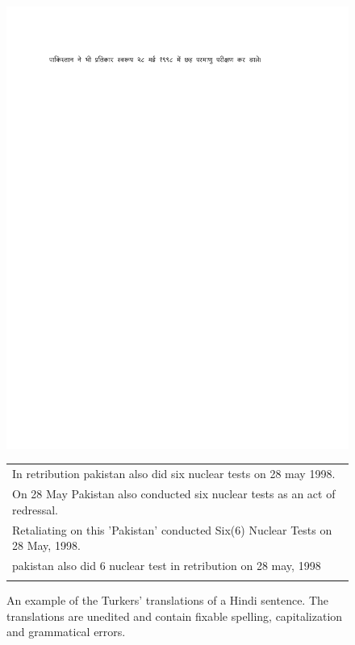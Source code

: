\documentclass[11pt]{article}
\begin{document}
\begin{figure}[t]
  \centering
  \includegraphics[width=1.05\linewidth]{figures/hindi.pdf}
  \footnotesize
  \begin{tabular}{p{\linewidth}}
    \hline
In retribution pakistan also did six nuclear tests on 28 may 1998.\\
On 28 May Pakistan also conducted six nuclear tests as an act of redressal.\\
Retaliating on this 'Pakistan' conducted Six(6) Nuclear Tests on 28 May, 1998.\\
pakistan also did 6 nuclear test in retribution on 28 may, 1998 \\ \\
  \end{tabular}
  \normalsize
  \caption{An example of the Turkers' translations of a Hindi sentence. The translations are unedited and contain fixable spelling, capitalization and grammatical errors.}
  \label{figure:variance}
\end{figure}
\end{document}

